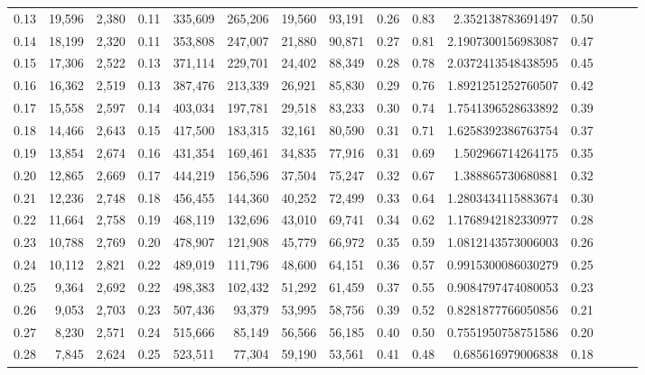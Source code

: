 \begin{tabular}{rrrrrrrrrrrrrrr}
0.13 &  19,596 &  2,380 &  0.11 &  335,609 &  265,206 &   19,560 &   93,191 &  0.26 &  0.83 &       2.352138783691497 &      0.50 \\
0.14 &  18,199 &  2,320 &  0.11 &  353,808 &  247,007 &   21,880 &   90,871 &  0.27 &  0.81 &      2.1907300156983087 &      0.47 \\
0.15 &  17,306 &  2,522 &  0.13 &  371,114 &  229,701 &   24,402 &   88,349 &  0.28 &  0.78 &      2.0372413548438595 &      0.45 \\
0.16 &  16,362 &  2,519 &  0.13 &  387,476 &  213,339 &   26,921 &   85,830 &  0.29 &  0.76 &      1.8921251252760507 &      0.42 \\
0.17 &  15,558 &  2,597 &  0.14 &  403,034 &  197,781 &   29,518 &   83,233 &  0.30 &  0.74 &      1.7541396528633892 &      0.39 \\
0.18 &  14,466 &  2,643 &  0.15 &  417,500 &  183,315 &   32,161 &   80,590 &  0.31 &  0.71 &      1.6258392386763754 &      0.37 \\
0.19 &  13,854 &  2,674 &  0.16 &  431,354 &  169,461 &   34,835 &   77,916 &  0.31 &  0.69 &       1.502966714264175 &      0.35 \\
0.20 &  12,865 &  2,669 &  0.17 &  444,219 &  156,596 &   37,504 &   75,247 &  0.32 &  0.67 &       1.388865730680881 &      0.32 \\
0.21 &  12,236 &  2,748 &  0.18 &  456,455 &  144,360 &   40,252 &   72,499 &  0.33 &  0.64 &      1.2803434115883674 &      0.30 \\
0.22 &  11,664 &  2,758 &  0.19 &  468,119 &  132,696 &   43,010 &   69,741 &  0.34 &  0.62 &      1.1768942182330977 &      0.28 \\
0.23 &  10,788 &  2,769 &  0.20 &  478,907 &  121,908 &   45,779 &   66,972 &  0.35 &  0.59 &      1.0812143573006003 &      0.26 \\
0.24 &  10,112 &  2,821 &  0.22 &  489,019 &  111,796 &   48,600 &   64,151 &  0.36 &  0.57 &      0.9915300086030279 &      0.25 \\
0.25 &   9,364 &  2,692 &  0.22 &  498,383 &  102,432 &   51,292 &   61,459 &  0.37 &  0.55 &      0.9084797474080053 &      0.23 \\
0.26 &   9,053 &  2,703 &  0.23 &  507,436 &   93,379 &   53,995 &   58,756 &  0.39 &  0.52 &      0.8281877766050856 &      0.21 \\
0.27 &   8,230 &  2,571 &  0.24 &  515,666 &   85,149 &   56,566 &   56,185 &  0.40 &  0.50 &      0.7551950758751586 &      0.20 \\
0.28 &   7,845 &  2,624 &  0.25 &  523,511 &   77,304 &   59,190 &   53,561 &  0.41 &  0.48 &       0.685616979006838 &      0.18 \\

\end{tabular}
